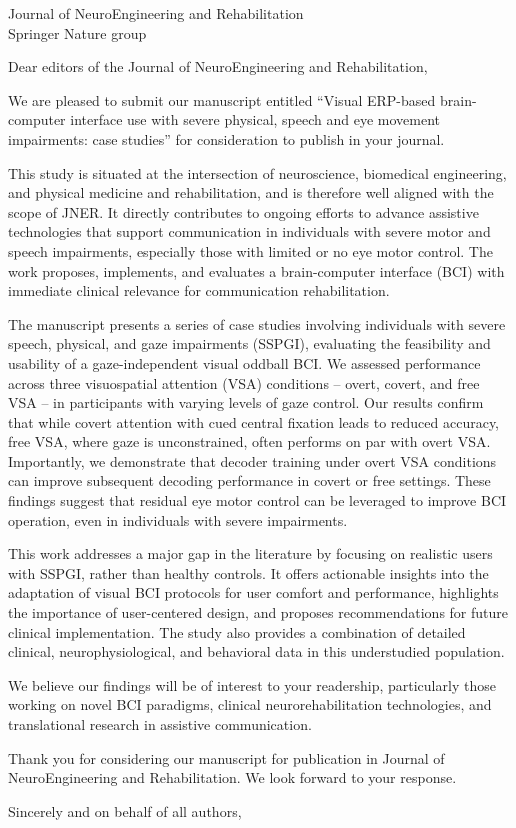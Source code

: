 \documentclass{letter}
\begin{document}
\begin{letter}{Journal of NeuroEngineering and Rehabilitation \\ Springer Nature group}

	\opening{Dear editors of the Journal of NeuroEngineering and Rehabilitation,}

	We are pleased to submit our manuscript entitled ``Visual ERP-based
	brain-computer interface use with severe physical, speech and eye movement
	impairments: case studies'' for consideration to publish in your journal.

	This study is situated at the intersection of neuroscience, biomedical
	engineering, and physical medicine and rehabilitation, and is therefore well
	aligned with the scope of JNER.
	It directly contributes to ongoing efforts to advance assistive technologies
	that support communication in individuals with severe motor and speech impairments,
	especially those with limited or no eye motor control.
	The work proposes, implements, and evaluates a brain-computer interface
	(BCI) with immediate clinical relevance for communication rehabilitation.

	The manuscript presents a series of case studies involving individuals with
	severe speech, physical, and gaze impairments (SSPGI), evaluating the
	feasibility and usability of a gaze-independent visual oddball BCI.
	We assessed performance across three visuospatial attention (VSA) conditions -- overt,
	covert,	and free VSA -- in participants with varying levels of gaze control.
	Our results	confirm that while covert attention with cued central fixation leads
	to reduced accuracy, free VSA, where gaze is unconstrained, often performs on
	par with overt VSA.
	Importantly, we demonstrate that decoder training under overt VSA
	conditions can improve subsequent decoding performance in covert or free
	settings.
	These findings suggest that residual eye motor control can be leveraged
	to improve BCI operation, even in individuals with severe impairments.

	This work addresses a major gap in the literature by focusing on realistic users with
	SSPGI, rather than healthy controls.
	It offers actionable insights into the adaptation of visual BCI protocols for
	user comfort and performance,	highlights the importance of user-centered
	design, and proposes recommendations for future clinical implementation.
	The study also provides a combination of detailed clinical,
	neurophysiological, and behavioral data in this	understudied population.

	We believe our findings will be of interest to your readership, particularly
	those working on novel BCI paradigms, clinical neurorehabilitation technologies,
	and translational research in assistive communication.

	Thank you for considering our manuscript for publication in Journal of
	NeuroEngineering and Rehabilitation. We look forward to your response.


	\closing{Sincerely and on behalf of all authors,}


\end{letter}
\end{document}
